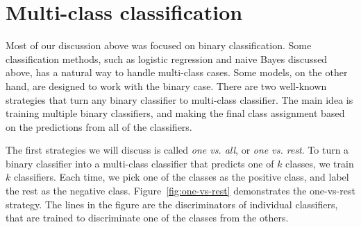 \section{Multi-class classification}

Most of our discussion above was focused on binary classification.
Some classification methods,
such as logistic regression and naive Bayes discussed above,
has a natural way to handle multi-class cases. 
Some models, on the other hand, are designed to work with the binary case.
There are two well-known strategies that turn any binary
classifier to multi-class classifier.
The main idea is training multiple binary classifiers,
and making the final class assignment based on
the predictions from all of the classifiers.

The first strategies we will discuss is called \emph{one vs. all},
or \emph{one vs. rest}.
To turn a binary classifier into a multi-class classifier
that predicts one of $k$ classes, we train $k$ classifiers.
Each time, we pick one of the classes as the positive class,
and label the rest as the negative class.
Figure~\ref{fig:one-vs-rest} demonstrates the one-vs-rest strategy.
The lines in the figure are the discriminators of individual classifiers,
that are trained to discriminate one of the classes from the others.
\begin{marginfigure}[-5\baselineskip]
  \centering
  \caption{\label{fig:one-vs-rest}%
    A demonstration of one-vs-rest multi-class strategy.
  }
\end{marginfigure}
